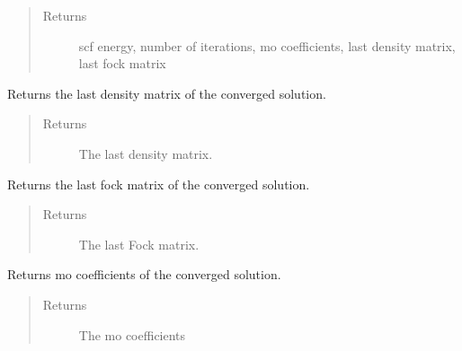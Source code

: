 \documentclass[letterpaper,10pt,english]{sphinxmanual}
\begin{document}
\begin{fulllineitems}
\begin{fulllineitems}
\begin{quote}
\begin{description}
\begin{itemize}
\end{itemize}

\item[{Returns}] \leavevmode
scf energy, number of iterations, mo coefficients, last density matrix, last fock matrix

\end{description}\end{quote}

\end{fulllineitems}


\begin{fulllineitems}
\label{\detokenize{RHF:ghf.RHF.RHF.get_last_dens}}
Returns the last density matrix of the converged solution.
\begin{quote}\begin{description}
\item[{Returns}] \leavevmode
The last density matrix.

\end{description}\end{quote}

\end{fulllineitems}


\begin{fulllineitems}
\label{\detokenize{RHF:ghf.RHF.RHF.get_last_fock}}
Returns the last fock matrix of the converged solution.
\begin{quote}\begin{description}
\item[{Returns}] \leavevmode
The last Fock matrix.

\end{description}\end{quote}

\end{fulllineitems}


\begin{fulllineitems}
\label{\detokenize{RHF:ghf.RHF.RHF.get_mo_coeff}}
Returns mo coefficients of the converged solution.
\begin{quote}\begin{description}
\item[{Returns}] \leavevmode
The mo coefficients


\end{description}
\end{quote}
\end{fulllineitems}
\end{fulllineitems}
\end{document}

